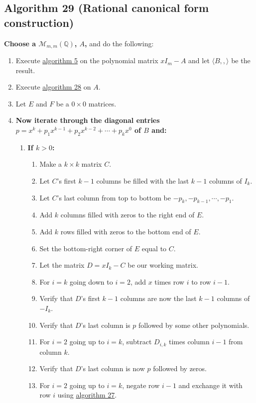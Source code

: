 \documentclass[twocolumn]{article}
\begin{document}
		\subsection{Algorithm 29 (Rational canonical form construction)}
			\textbf{Choose a $\mathcal{M}_{m,m}(\mathbb{Q})$, $A$,} and do the following:
			\begin{enumerate}
				\item Execute \hyperref[sec:algorithm 5]{algorithm 5} on the polynomial matrix $xI_m-A$ and let $\langle B,,\rangle$ be the result.
				\item Execute \hyperref[sec:algorithm 28]{algorithm 28} on $A$.
				\item Let $E$ and $F$ be a $0\times 0$ matrices.
				\item \textbf{Now iterate through the diagonal entries $p=x^k+p_1x^{k-1}+p_2x^{k-2}+\cdots+p_kx^0$ of $B$ and:}
				\begin{enumerate}
					\item \textbf{If $k>0$:}
					\begin{enumerate}
						\item Make a $k\times k$ matrix $C$.
						\item Let $C$'s first $k-1$ columns be filled with the last $k-1$ columns of $I_k$.
						\item Let $C$'s last column from top to bottom be $-p_k, -p_{k-1},\cdots,-p_1$.
						\item Add $k$ columns filled with zeros to the right end of $E$.
						\item Add $k$ rows filled with zeros to the bottom end of $E$.
						\item Set the bottom-right corner of $E$ equal to $C$.
						\item Let the matrix $D=xI_k-C$ be our working matrix.
						\item For $i=k$ going down to $i=2$, add $x$ times row $i$ to row $i-1$.
						\item Verify that $D$'s first $k-1$ columns are now the last $k-1$ columns of $-I_k$.
						\item Verify that $D$'s last column is $p$ followed by some other polynomials.
						\item For $i=2$ going up to $i=k$, subtract $D_{i, k}$ times column $i-1$ from column $k$.
						\item Verify that $D$'s last column is now $p$ followed by zeros.
						\item For $i=2$ going up to $i=k$, negate row $i-1$ and exchange it with row $i$ using \hyperref[sec:algorithm 27]{algorithm 27}.

\end{enumerate}
\end{enumerate}
\end{enumerate}
\end{document}
